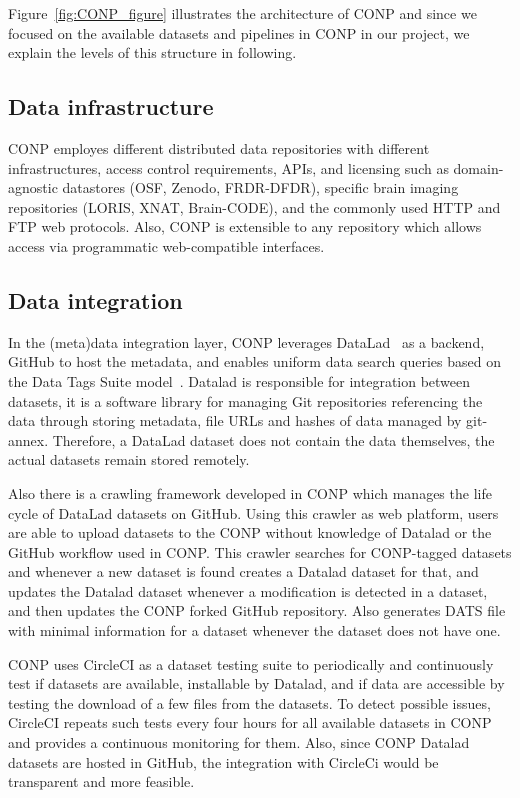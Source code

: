 Figure~\ref{fig:CONP_figure} illustrates the architecture of CONP and since we focused on the available datasets and pipelines in CONP in our project, we explain the levels of this structure in following. 

\subsection{Data infrastructure}
CONP employes different distributed data repositories with different infrastructures, access control requirements, APIs, and licensing such as domain-agnostic datastores (OSF, Zenodo, FRDR-DFDR), specific brain imaging repositories (LORIS, XNAT, Brain-CODE), and the commonly used HTTP and FTP web protocols. Also, CONP is extensible to any repository which allows access via programmatic web-compatible interfaces.

\subsection{Data integration}
In the (meta)data integration layer, CONP leverages DataLad~\cite{datalad2021} as a backend, GitHub to host the metadata, and enables uniform data search queries based on the Data Tags Suite model~\cite{DATSDocumentation}. Datalad is responsible for integration between datasets, it is a software library for managing Git repositories referencing the data through storing metadata, file URLs and hashes of data managed by git-annex. Therefore, a DataLad dataset does not contain the data themselves, the actual datasets remain stored remotely.

Also there is a crawling framework developed in CONP which manages the life cycle of DataLad datasets on GitHub. Using this crawler as web platform, users are able to upload datasets to the CONP without knowledge of Datalad or the GitHub workflow used in CONP. This crawler searches for CONP-tagged datasets and whenever a new dataset is found creates a Datalad dataset for that, and updates the Datalad dataset whenever a modification is detected in a dataset, and then updates the CONP forked GitHub repository. Also generates DATS file with minimal information for a dataset whenever the dataset does not have one.

CONP uses CircleCI as a dataset testing suite to periodically and continuously test if datasets are available, installable by Datalad, and if data are accessible by testing the download of a few files from the datasets. To detect possible issues, CircleCI repeats such tests every four hours for all available datasets in CONP and provides a continuous monitoring for them. Also, since CONP Datalad datasets are hosted in GitHub, the integration with CircleCi would be transparent and more feasible.

